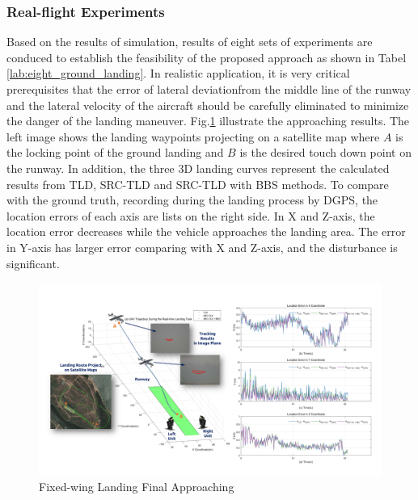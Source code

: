 


\subsubsection{Real-flight Experiments}
Based on the results of simulation, results of eight sets of experiments are conduced to establish the feasibility of the proposed approach as shown in Tabel \ref{lab:eight_ground_landing}. In realistic application, it is very critical prerequisites that the error of lateral deviationfrom the middle line of the runway and the lateral velocity of the aircraft should be carefully eliminated to minimize the danger of the landing maneuver. Fig.\ref{fig:sci02_landing_results_big} illustrate the approaching results. The left image shows the landing waypoints projecting on a satellite map where $A$ is the locking point of the ground landing and $B$ is the desired touch down point on the runway. In addition, the three 3D landing curves represent the calculated results from TLD, SRC-TLD and SRC-TLD with BBS methods. To compare with the ground truth, recording during the landing process by DGPS, the location errors of each axis are lists on the right side. In X and Z-axis, the location error decreases while the vehicle approaches the landing area. The error in Y-axis has larger error comparing with X and Z-axis, and the disturbance is significant.

\begin{figure}[!th]
	\centering
	\includegraphics[width=\textwidth]{Figs/sci02_landing_results_big.pdf}	
	\caption{Fixed-wing Landing Final Approaching}
	\label{fig:sci02_landing_results_big}
\end{figure}


